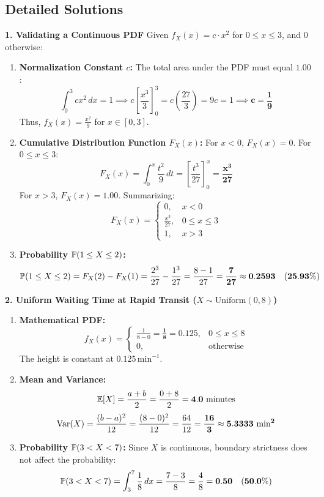 \subsection*{Detailed Solutions}

\textbf{1. Validating a Continuous PDF}
Given $f_X(x) = c \cdot x^2$ for $0 \le x \le 3$, and $0$ otherwise:
\begin{enumerate}
    \item \textbf{Normalization Constant $c$:}
    The total area under the PDF must equal $1.00$:
    $$\int_0^3 c x^2 \, dx = 1 \implies c \left[ \frac{x^3}{3} \right]_0^3 = c \left( \frac{27}{3} \right) = 9c = 1 \implies \mathbf{c = \frac{1}{9}}$$
    Thus, $f_X(x) = \frac{x^2}{9}$ for $x \in [0, 3]$.
    \item \textbf{Cumulative Distribution Function $F_X(x)$:}
    For $x < 0$, $F_X(x) = 0$. For $0 \le x \le 3$:
    $$F_X(x) = \int_0^x \frac{t^2}{9} \, dt = \left[ \frac{t^3}{27} \right]_0^x = \mathbf{\frac{x^3}{27}}$$
    For $x > 3$, $F_X(x) = 1.00$. Summarizing:
    $$F_X(x) = \begin{cases}
    0, & x < 0 \\
    \frac{x^3}{27}, & 0 \le x \le 3 \\
    1, & x > 3
    \end{cases}$$
    \item \textbf{Probability $\P(1 \le X \le 2)$:}
    $$\P(1 \le X \le 2) = F_X(2) - F_X(1) = \frac{2^3}{27} - \frac{1^3}{27} = \frac{8 - 1}{27} = \mathbf{\frac{7}{27} \approx 0.2593 \quad (25.93\%)}$$
\end{enumerate}

\textbf{2. Uniform Waiting Time at Rapid Transit ($X \sim \text{Uniform}(0, 8)$)}
\begin{enumerate}
    \item \textbf{Mathematical PDF:}
    $$f_X(x) = \begin{cases}
    \frac{1}{8 - 0} = \mathbf{\frac{1}{8} = 0.125}, & 0 \le x \le 8 \\
    0, & \text{otherwise}
    \end{cases}$$
    The height is constant at $0.125\,\text{min}^{-1}$.
    \item \textbf{Mean and Variance:}
    $$\E[X] = \frac{a + b}{2} = \frac{0 + 8}{2} = \mathbf{4.0 \text{ minutes}}$$
    $$\Var(X) = \frac{(b - a)^2}{12} = \frac{(8 - 0)^2}{12} = \frac{64}{12} = \mathbf{\frac{16}{3} \approx 5.3333 \text{ min}^2}$$
    \item \textbf{Probability $\P(3 < X < 7)$:}
    Since $X$ is continuous, boundary strictness does not affect the probability:
    $$\P(3 < X < 7) = \int_3^7 \frac{1}{8} \, dx = \frac{7 - 3}{8} = \frac{4}{8} = \mathbf{0.50 \quad (50.0\%)}$$
\end{enumerate}

